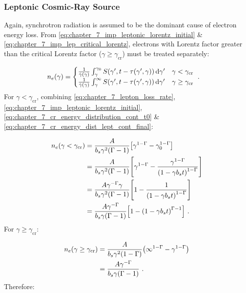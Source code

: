 \subsubsection{Leptonic Cosmic-Ray Source}
Again, synchrotron radiation is assumed to be the dominant cause of electron energy loss. From \autoref{eq:chapter_7_imp_leptonic_lorentz_initial} \& \autoref{eq:chapter_7_imp_lep_critical_lorentz}, electrons with Lorentz factor greater than the critical Lorentz factor ($\gamma\geq\gamma_\text{cr}$) must be treated separately:

\begin{equation}
    \begin{aligned}
    	n_e\qty(\gamma)&=
	\begin{cases}
	\frac{1}{\dot{\gamma}\qty(\gamma)}\int_{\gamma}^{\gamma_0}S\qty(\gamma',t-\tau\qty(\gamma',\gamma))\dd{\gamma'}  &\gamma < \gamma_\text{cr}\\
	\frac{1}{\dot{\gamma}\qty(\gamma)}\int_{\gamma}^{\infty}S\qty(\gamma',t-\tau\qty(\gamma',\gamma))\dd{\gamma'} &\gamma \geq \gamma_\text{cr}\\
	\end{cases}\text{ .} \label{eq:chapter_7_cr_energy_dist_lept_cont_final}
    \end{aligned}
\end{equation}
\noindent For $\gamma < \gamma_\text{cr}$, combining \autoref{eq:chapter_7_lepton_loss_rate}, \autoref{eq:chapter_7_imp_leptonic_lorentz_initial}, \autoref{eq:chapter_7_cr_energy_distribution_cont_t0} \& \autoref{eq:chapter_7_cr_energy_dist_lept_cont_final}:

\begin{equation}
    \begin{aligned}
    	n_e\qty(\gamma< \gamma_\text{cr})&=\frac{A}{b_s\gamma^2\qty(\Gamma-1)}\qty[\gamma^{1-\Gamma}-\gamma_0^{1-\Gamma}] \\
	&=\frac{A}{b_s\gamma^2\qty(\Gamma-1)}\qty[\gamma^{1-\Gamma}-\frac{\gamma^{1-\Gamma}}{\qty(1-\gamma b_s t)^{1-\Gamma}}] \\
	&=\frac{A\gamma^{-\Gamma}\gamma}{b_s\gamma^2\qty(\Gamma-1)}\qty[1-\frac{1}{\qty(1-\gamma b_s t)^{1-\Gamma}}] \\
	&=\frac{A\gamma^{-\Gamma}}{b_s\gamma\qty(\Gamma-1)}\qty[1-\qty(1-\gamma b_s t)^{\Gamma-1}]\text{ .}
    \end{aligned}
\end{equation}
\noindent For $\gamma \geq \gamma_\text{cr}$:

\begin{equation}
    \begin{aligned}
    n_e\qty(\gamma\geq \gamma_\text{cr})&=\frac{A}{b_s\gamma^2\qty(1-\Gamma)}\qty(\infty^{1-\Gamma}-\gamma^{1-\Gamma}) \\
	&=\frac{A\gamma^{-\Gamma}}{b_s\gamma\qty(\Gamma-1)}\text{ .}
    \end{aligned}
\end{equation}
\noindent Therefore:

